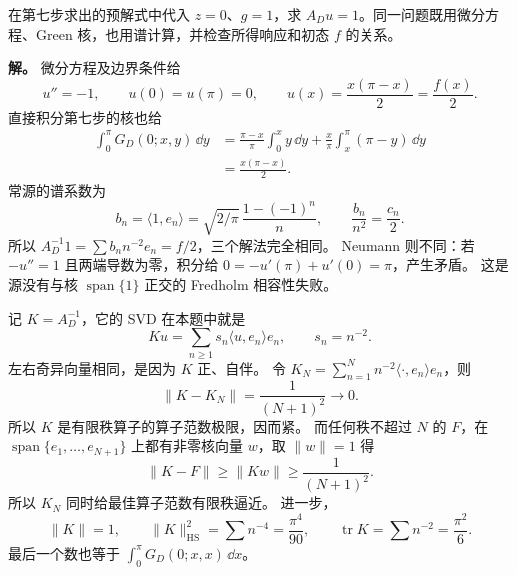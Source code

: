 \begin{exbox}
在第七步求出的预解式中代入 $z=0$、$g=1$，求 $A_Du=1$。同一问题既用微分方程、Green 核，也用谱计算，并检查所得响应和初态 $f$ 的关系。

\textbf{解。} 微分方程及边界条件给
\[
 u''=-1,\qquad u(0)=u(\pi)=0,
 \qquad u(x)=\frac{x(\pi-x)}2=\frac{f(x)}2.
\]
直接积分第七步的核也给
\begin{align*}
 \int_0^\pi G_D(0;x,y)\,\dd y
 &=\frac{\pi-x}\pi\int_0^x y\,\dd y
  +\frac x\pi\int_x^\pi(\pi-y)\,\dd y\\
 &=\frac{x(\pi-x)}2.
\end{align*}
常源的谱系数为
\[
 b_n=\langle1,e_n\rangle
 =\sqrt{2/\pi}\,\frac{1-(-1)^n}{n},
 \qquad \frac{b_n}{n^2}=\frac{c_n}{2}.
\]
所以 $A_D^{-1}1=\sum b_nn^{-2}e_n=f/2$，三个解法完全相同。
Neumann 则不同：若 $-u''=1$ 且两端导数为零，积分给 $0=-u'(\pi)+u'(0)=\pi$，产生矛盾。
这是源没有与核 $\operatorname{span}\{1\}$ 正交的 Fredholm 相容性失败。

记 $K=A_D^{-1}$，它的 SVD 在本题中就是
\[
 Ku=\sum_{n\ge1}s_n\langle u,e_n\rangle e_n,
 \qquad s_n=n^{-2}.
\]
左右奇异向量相同，是因为 $K$ 正、自伴。
令 $K_N=\sum_{n=1}^N n^{-2}\langle\cdot,e_n\rangle e_n$，则
\[
 \|K-K_N\|=\frac1{(N+1)^2}\longrightarrow0.
\]
所以 $K$ 是有限秩算子的算子范数极限，因而紧。
而任何秩不超过 $N$ 的 $F$，在 $\operatorname{span}\{e_1,\ldots,e_{N+1}\}$ 上都有非零核向量 $w$，取 $\|w\|=1$ 得
\[
 \|K-F\|\ge\|Kw\|\ge\frac1{(N+1)^2}.
\]
所以 $K_N$ 同时给最佳算子范数有限秩逼近。
进一步，
\[
 \|K\|=1,\qquad \|K\|_{\mathrm{HS}}^2=\sum n^{-4}=\frac{\pi^4}{90},
 \qquad \operatorname{tr}K=\sum n^{-2}=\frac{\pi^2}{6}.
\]
最后一个数也等于 $\int_0^\pi G_D(0;x,x)\,\dd x$。
\end{exbox}

